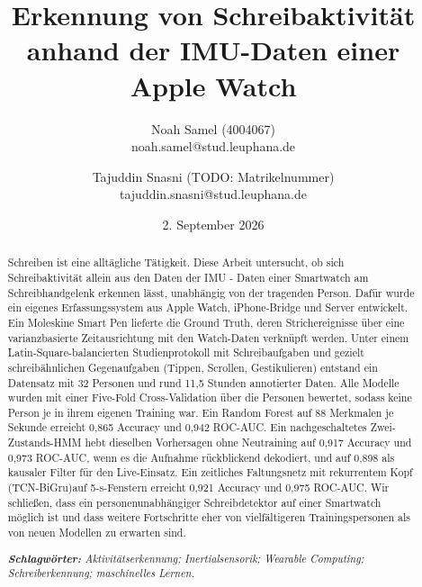 \documentclass[11pt]{article}
\title{Erkennung von Schreibaktivität anhand der IMU-Daten einer Apple Watch}
\author{Noah Samel (4004067)\\
    noah.samel@stud.leuphana.de
\and
    Tajuddin Snasni (TODO: Matrikelnummer)\\
    tajuddin.snasni@stud.leuphana.de}
\date{2. September 2026}
\begin{document}

{
\maketitle
\begin{abstract}
\noindent
Schreiben ist eine alltägliche Tätigkeit. Diese Arbeit
untersucht, ob sich Schreibaktivität allein aus den Daten der IMU - Daten
einer Smartwatch am Schreibhandgelenk erkennen lässt,
unabhängig von der tragenden Person. Dafür wurde ein eigenes Erfassungssystem
aus Apple Watch, iPhone-Bridge und Server entwickelt. Ein Moleskine Smart Pen
lieferte die Ground Truth, deren Strichereignisse über eine varianzbasierte
Zeitausrichtung mit den Watch-Daten verknüpft werden. Unter einem
Latin-Square-balancierten Studienprotokoll mit Schreibaufgaben und gezielt
schreibähnlichen Gegenaufgaben (Tippen, Scrollen, Gestikulieren) entstand ein
Datensatz mit 32 Personen und rund 11,5 Stunden annotierter Daten. Alle
Modelle wurden mit einer Five-Fold Cross-Validation über die
Personen bewertet, sodass keine Person je in ihrem eigenen Training war. Ein Random
Forest auf 88 Merkmalen je Sekunde erreicht 0,865 Accuracy und 0,942
ROC-AUC. Ein nachgeschaltetes Zwei-Zustands-HMM hebt dieselben Vorhersagen ohne
Neutraining auf 0,917 Accuracy und 0,973 ROC-AUC, wenn es die Aufnahme
rückblickend dekodiert, und auf 0,898 als kausaler Filter für den
Live-Einsatz. Ein zeitliches Faltungsnetz mit rekurrentem Kopf (TCN-BiGru)auf
5-s-Fenstern erreicht 0,921 Accuracy und 0,975 ROC-AUC. Wir schließen,
dass ein personenunabhängiger Schreibdetektor auf einer Smartwatch möglich
ist und dass weitere Fortschritte eher von vielfältigeren Trainingspersonen
als von neuen Modellen zu erwarten sind.

\medskip
\noindent
\textit{\textbf{Schlagwörter: }Aktivitätserkennung; Inertialsensorik;
Wearable Computing; Schreiberkennung; maschinelles Lernen.}
\end{abstract}
}












\medskip

\end{document}
